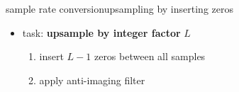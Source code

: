 	\begin{frame}{sample rate conversion}{upsampling by inserting zeros}
        \begin{itemize}
            \item   task: \textbf{upsample by integer factor} $L$
            \pause 
            \begin{enumerate}
                \item   insert $L-1$ zeros between all samples
                \item   apply anti-imaging filter
            \end{enumerate}
        \end{itemize}
        \vspace{50mm}
    \end{frame}
